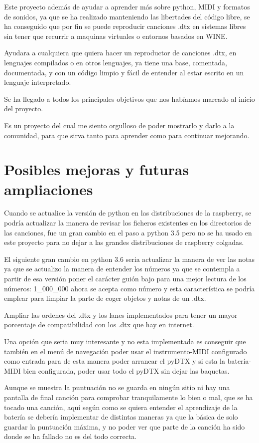 \documentclass[a4paper,11pt,oneside]{book}
\begin{document}
Este proyecto además de ayudar a aprender más sobre python, MIDI y formatos de sonidos, ya que se ha realizado manteniendo las libertades del código libre, se ha conseguido que por fin se puede reproducir canciones .dtx en sistemas libres sin tener que recurrir a maquinas virtuales o entornos basados en WINE.

Ayudara a cualquiera que quiera hacer un reproductor de canciones .dtx, en lenguajes compilados o en otros lenguajes, ya tiene una base, comentada, documentada, y con un código limpio y fácil de entender al estar escrito en un lenguaje interpretado.

Se ha llegado a todos los principales objetivos que nos habíamos marcado al inicio del proyecto.

Es un proyecto del cual me siento orgulloso de poder mostrarlo y darlo a la comunidad, para que sirva tanto para aprender como para continuar mejorando.

\section{Posibles mejoras y futuras ampliaciones}

Cuando se actualice la versión de python en las distribuciones de la raspberry, se podría actualizar la manera de revisar los ficheros existentes en los directorios de las canciones, fue un gran cambio en el paso a python 3.5 pero no se ha usado en este proyecto para no dejar a las grandes distribuciones de raspberry colgadas.

El siguiente gran cambio en python 3.6 seria actualizar la manera de ver las notas ya que se actualizo la manera de entender los números ya que se contempla a partir de esa versión poner el carácter guión bajo para una mejor lectura de los números: 1\_000\_000 ahora se acepta como número y esta característica se podría emplear para limpiar la parte de coger objetos y notas de un .dtx.

Ampliar las ordenes del .dtx y los lanes implementados para tener un mayor porcentaje de compatibilidad con los .dtx que hay en internet.

Una opción que seria muy interesante y no esta implementada es conseguir que también en el menú de navegación poder usar el instrumento-MIDI configurado como entrada para de esta manera poder arrancar el pyDTX y si esta la batería-MIDI bien configurada, poder usar todo el pyDTX sin dejar las baquetas.

Aunque se muestra la puntuación no se guarda en ningún sitio ni hay una pantalla de final canción para comprobar tranquilamente lo bien o mal, que se ha tocado una canción, aquí según como se quiera entender el aprendizaje de la batería se debería implementar de distintas maneras ya que la básica de solo guardar la puntuación máxima, y no poder ver que parte de la canción ha sido donde se ha fallado no es del todo correcta.
\end{document}
